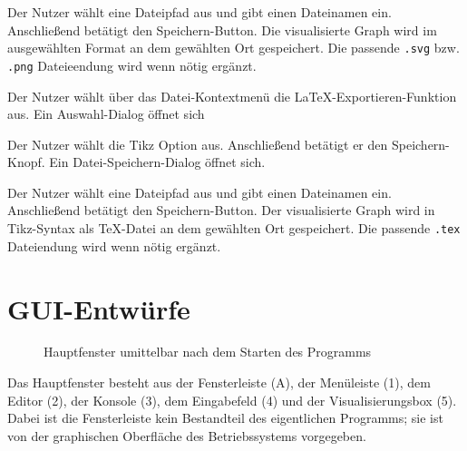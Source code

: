 \documentclass[parskip=full,11pt,twoside]{scrartcl}
\begin{document}
{Der Nutzer wählt eine Dateipfad aus und gibt einen Dateinamen ein. Anschließend betätigt den Speichern-Button.}
{Die visualisierte Graph wird im ausgewählten Format an dem gewählten Ort gespeichert. Die passende \texttt{.svg} bzw. \texttt{.png} Dateieendung wird wenn nötig ergänzt.}



{Der Nutzer wählt über das Datei-Kontextmenü die LaTeX-Exportieren-Funktion aus.}
{Ein Auswahl-Dialog öffnet sich}

{Der Nutzer wählt die Tikz Option aus. Anschließend betätigt er den Speichern-Knopf.}
{Ein Datei-Speichern-Dialog öffnet sich.}

{Der Nutzer wählt eine Dateipfad aus und gibt einen Dateinamen ein. Anschließend betätigt den Speichern-Button.}
{Der visualisierte Graph wird in Tikz-Syntax als TeX-Datei an dem gewählten Ort gespeichert. Die passende \texttt{.tex} Dateiendung wird wenn nötig ergänzt.}



\pagebreak
\appendix

\section{GUI-Entwürfe}

\begin{figure}[hb]
\caption{\label{fig:editor}
    Hauptfenster umittelbar nach dem Starten des Programms
}
\end{figure}

Das Hauptfenster besteht aus der Fensterleiste (A), der Menüleiste (1), dem Editor (2), der Konsole (3), dem Eingabefeld (4) und der Visualisierungsbox (5).
Dabei ist die Fensterleiste kein Bestandteil des eigentlichen Programms; sie ist von der graphischen Oberfläche des Betriebssystems vorgegeben.
\end{document}
